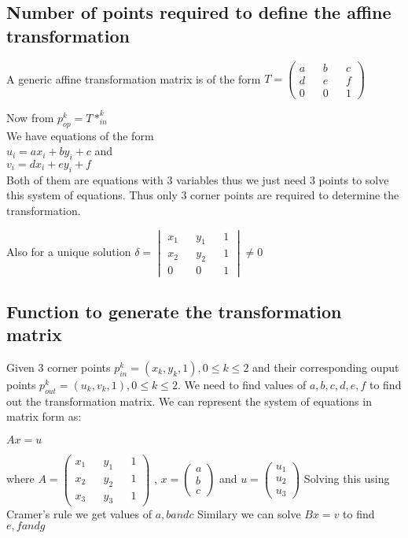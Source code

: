 \documentclass[paper=a4, fontsize=11pt]{scrartcl} %
\numberwithin{equation}{section} %
\numberwithin{figure}{section} %
\numberwithin{table}{section} %
\begin{document}

\subsection{Number of points required to define the affine transformation}

A generic affine transformation matrix is of the form
\(
  T = 
  \begin{pmatrix}
    a && b && c\\
    d && e && f\\
    0 && 0 && 1
  \end{pmatrix}
\) 

Now from \(p_{op}^k = T*_{in}^k\)\\
We have equations of the form \\
\(u_i = ax_i + by_i + c\) and\\
\(v_i = dx_i + ey_i + f\)\\
Both of them are equations with 3 variables thus we just need 3 points to solve this system of equations. Thus only 3 corner points are required to determine the transformation.

Also for a unique solution
\(
  \delta = 
  \begin{vmatrix}
    x_1 && y_1 && 1 \\
    x_2 && y_2 && 1 \\
    0 && 0 && 1
  \end{vmatrix} 
  \neq 0
\)



\subsection{Function to generate the transformation matrix}

Given 3 corner points \(p_{in}^k = (x_k,y_k,1), 0 \leq k \leq 2\) and their corresponding ouput points \(p_{out}^k = (u_k,v_k,1), 0 \leq k \leq 2\). We need to find values of \(a,b,c,d,e,f\) to find out the transformation matrix. We can represent the system of equations in matrix form as:

\(Ax = u\)

where \( A =
        \begin{pmatrix}
          x_1 && y_1 && 1\\
          x_2 && y_2 && 1\\
          x_3 && y_3 && 1  
        \end{pmatrix}
      \) , \(x = \begin{pmatrix} a\\ b\\ c \end{pmatrix}\) and \(u = \begin{pmatrix} u_1\\ u_2\\ u_3 \end{pmatrix}\)
Solving this using Cramer's rule we get values of \(a, b and c\)
Similary we can solve
\(Bx = v\) 
to find \(e,f and g\)
\end{document}
